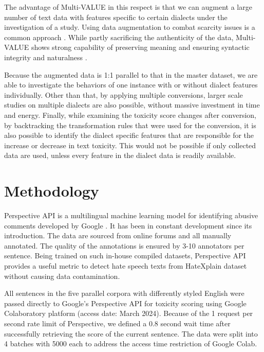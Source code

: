 \documentclass[11pt]{article}
\begin{document}
The advantage of Multi-VALUE in this respect is that we can augment a large number of text data with features specific to certain dialects under the investigation of a study. Using data augmentation to combat scarcity issues is a common approach \citep{bird-2020-augmentation}. While partly sacrificing the authenticity of the data, Multi-VALUE shows strong capability of preserving meaning and ensuring syntactic integrity and naturalness \citep{ziems-2022-value, ziems-2023-multi}.

Because the augmented data is 1:1 parallel to that in the master dataset, we are able to investigate the behaviors of one instance with or without dialect features individually. Other than that, by applying multiple conversions, larger scale studies on multiple dialects are also possible, without massive investment in time and energy. Finally, while examining the toxicity score changes after conversion, by backtracking the transformation rules that were used for the conversion, it is also possible to identify the dialect specific features that are responsible for the increase or decrease in text toxicity. This would not be possible if only collected data are used, unless every feature in the dialect data is readily available.

\section{Methodology}

Perspective API is a multilingual machine learning model for identifying abusive comments developed by Google \citep{jigsaw-2017-perspective}. It has been in constant development since its introduction. The data are sourced from online forums and all manually annotated. The quality of the annotations is ensured by 3-10 annotators per sentence. Being trained on such in-house compiled datasets, Perspective API provides a useful metric to detect hate speech texts from HateXplain dataset without causing data contamination.

All sentences in the five parallel corpora with differently styled English were passed directly to Google’s Perspective API for toxicity scoring using Google Colaboratory platform (access date: March 2024). Because of the 1 request per second rate limit of Perspective, we defined a 0.8 second wait time after successfully retrieving the score of the current sentence. The data were split into 4 batches with 5000 each to address the access time restriction of Google Colab.
\end{document}
